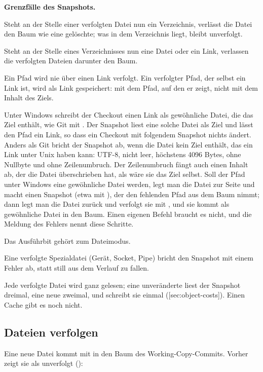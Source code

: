 \startinfobox
{\bf Grenzfälle des Snapshots.}
\startitemize
\item Steht an der Stelle einer verfolgten Datei nun ein Verzeichnis,
verlässt die Datei den Baum wie eine gelöschte;
was in dem Verzeichnis liegt, bleibt unverfolgt.
\item Steht an der Stelle eines Verzeichnisses nun eine Datei oder ein Link,
verlassen die verfolgten Dateien darunter den Baum.
\item Ein Pfad wird nie über einen Link verfolgt.
Ein verfolgter Pfad, der selbst ein Link ist, wird als Link gespeichert:
mit dem Pfad, auf den er zeigt, nicht mit dem Inhalt des Ziels.
\item Unter Windows schreibt der Checkout einen Link als gewöhnliche Datei,
die das Ziel enthält, wie Git mit .
Der Snapshot liest eine solche Datei als Ziel und lässt den Pfad ein Link,
so dass ein Checkout mit folgendem Snapshot nichts ändert.
Anders als Git bricht der Snapshot ab, wenn die Datei kein Ziel enthält,
das ein Link unter Unix haben kann:
UTF-8, nicht leer, höchstens 4096 Bytes, ohne Nullbyte und ohne Zeilenumbruch.
Der Zeilenumbruch fängt auch einen Inhalt ab, der die Datei überschrieben hat,
als wäre sie das Ziel selbst.
Soll der Pfad unter Windows eine gewöhnliche Datei werden,
legt man die Datei zur Seite
und macht einen Snapshot (etwa mit ),
der den fehlenden Pfad aus dem Baum nimmt;
dann legt man die Datei zurück und verfolgt sie mit ,
und sie kommt als gewöhnliche Datei in den Baum.
Einen eigenen Befehl braucht es nicht, und die Meldung des Fehlers nennt diese Schritte.
\item Das Ausführbit gehört zum Dateimodus.
\item Eine verfolgte Spezialdatei (Gerät, Socket, Pipe) bricht den Snapshot mit einem Fehler ab,
statt still aus dem Verlauf zu fallen.
\item Jede verfolgte Datei wird ganz gelesen; eine unveränderte liest der Snapshot dreimal,
eine neue zweimal, und schreibt sie einmal ([sec:object-costs]).
Einen Cache gibt es noch nicht.
\stopitemize
\stopinfobox

\subsection{Dateien verfolgen}

Eine neue Datei kommt mit  in den Baum des Working-Copy-Commits.
Vorher zeigt  sie als unverfolgt ():

